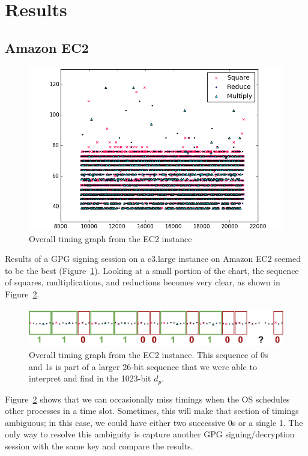 \documentclass[11pt]{llncs}
\begin{document}
\section{Results}

\subsection{Amazon EC2}

\begin{figure}[h]
  \centering
    \includegraphics[width=\linewidth]{img/data/ec2}
  \caption{Overall timing graph from the EC2 instance}
  \label{fig:data-ec2}
\end{figure}

Results of a GPG signing session on a c3.large instance on Amazon EC2 seemed to
be the best (Figure~\ref{fig:data-ec2}). Looking at a small portion of the
chart, the sequence of squares, multiplications, and reductions becomes very
clear, as shown in Figure~\ref{fig:data-ec2-zoomed}.

\begin{figure}[h]
  \centering
    \includegraphics[width=\linewidth]{img/data/ec2-zoomed}
  \caption{Overall timing graph from the EC2 instance. This
  sequence of 0s and 1s is part of a larger 26-bit sequence that we were able to
  interpret and find in the 1023-bit $d_p$.}
  \label{fig:data-ec2-zoomed}
\end{figure}

Figure~\ref{fig:data-ec2-zoomed} shows that we can occasionally miss timings
when the OS schedules other processes in a time slot. Sometimes, this will make
that section of timings ambiguous; in this case, we could have either two
successive 0s or a single 1. The only way to resolve this ambiguity is capture
another GPG signing/decryption session with the same key and compare the
results.
\end{document}
